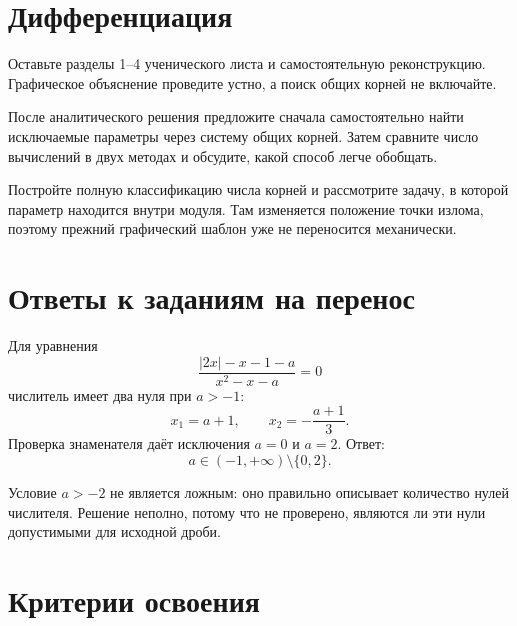 \section{Дифференциация}

\begin{teacherbox}
  Оставьте разделы 1--4 ученического листа и самостоятельную реконструкцию.
  Графическое объяснение проведите устно, а поиск общих корней не включайте.
\end{teacherbox}

\begin{teacherbox}
  После аналитического решения предложите сначала самостоятельно найти
  исключаемые параметры через систему общих корней. Затем сравните число
  вычислений в двух методах и обсудите, какой способ легче обобщать.
\end{teacherbox}

\begin{teacherbox}
  Постройте полную классификацию числа корней и рассмотрите задачу, в которой
  параметр находится внутри модуля. Там изменяется положение точки излома,
  поэтому прежний графический шаблон уже не переносится механически.
\end{teacherbox}

\section{Ответы к заданиям на перенос}

\begin{propertybox}[Задание 1]
  Для уравнения
  \[
    \frac{|2x|-x-1-a}{x^2-x-a}=0
  \]
  числитель имеет два нуля при \(a>-1\):
  \[
    x_1=a+1,
    \qquad
    x_2=-\frac{a+1}{3}.
  \]
  Проверка знаменателя даёт исключения \(a=0\) и \(a=2\). Ответ:
  \[
    \boxed{a\in(-1,+\infty)\setminus\{0,2\}}.
  \]
\end{propertybox}

\begin{propertybox}[Задание 2]
  Условие \(a>-2\) не является ложным: оно правильно описывает количество
  нулей числителя. Решение неполно, потому что не проверено, являются ли эти
  нули допустимыми для исходной дроби.
\end{propertybox}

\clearpage
\section{Критерии освоения}

